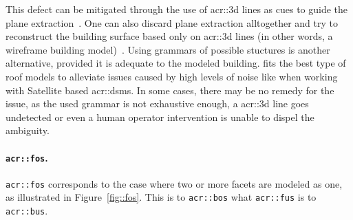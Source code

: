                 This defect can be mitigated through the use of \gls{acr::3d} lines as cues to guide the plane extraction~\parencite{zebedin2008fusion,sinha2009piecewise}.
                One can also discard plane extraction alltogether and try to reconstruct the building surface based only on \gls{acr::3d} lines (in other words, a wireframe building model)~\parencite{hofer2017efficient,langlois2019surface}.
                Using grammars of possible stuctures is another alternative, provided it is adequate to the modeled building.
                \textcite{lafarge2008structural} fits the best type of roof models to alleviate issues caused by high levels of noise like when working with Satellite based \glspl{acr::dsm}.
                In some cases, there may be no remedy for the issue, as the used grammar is not exhaustive enough, a \gls{acr::3d} line goes undetected or even a human operator intervention is unable to dispel the ambiguity.

            \paragraph{\texttt{\acrlong*{acr::fos}}.}
                \texttt{\gls{acr::fos}} corresponds to the case where two or more facets are modeled as one, as illustrated in Figure~\ref{fig::fos}.
                This is to \texttt{\gls{acr::bos}} what \texttt{\gls{acr::fus}} is to \texttt{\gls{acr::bus}}.\\

                \begin{figure}[htb]
                    \centering
                \end{figure}

